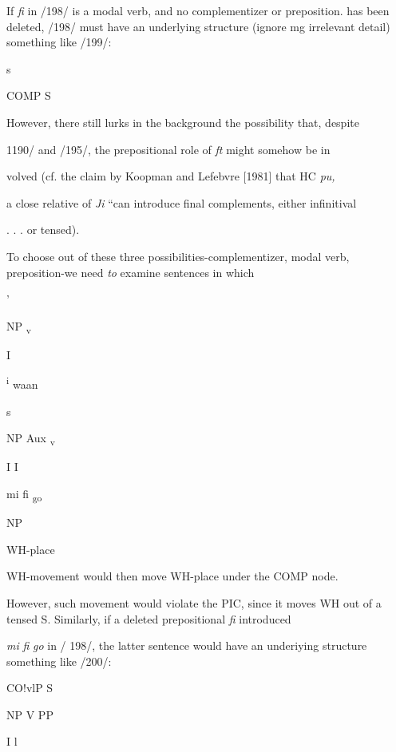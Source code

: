 If \textit{fi} in /198/ is a modal verb, and no complementizer or preposition. has been deleted, /198/ must have an underlying structure (ignore
mg irrelevant detail) something like /199/:

\ea\label{ex:199}

\glt
\z

s

COMP S

However, there still lurks in the background the possibility that, despite

1190/ and /195/, the prepositional role of \textit{ft} might somehow be in\-

volved (cf. the claim by Koopman and Lefebvre [1981] that HC \textit{pu,}

a close relative of \textit{Ji} ``can introduce final complements, either infinitival

. . . or tensed{\textquotedbl}).

To choose out of these three possibilities-complementizer, modal verb, preposition-we need \textit{to }examine sentences in which

'

NP \textsubscript{v}

I 

\textsuperscript{i }waan

s

NP Aux\textsubscript{ }\textsubscript{v}

I I 

mi fi \textsubscript{go}

NP

WH-place


WH-movement would then move WH-place under the COMP node.

However, such movement would violate the PIC, since it moves WH out of a tensed S. Similarly, if a deleted prepositional \textit{fi} introduced

\ea\label{ex:201}
 
\glt
\z


\textit{mi} \textit{fi} \textit{go} in / 198/, the latter sentence would have an underiying struc\-ture something like /200/:

\ea\label{ex:200}
 
\glt
\z

CO!vlP S

NP V PP

I l


